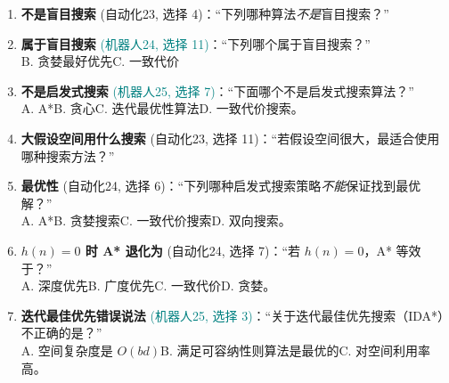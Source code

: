 ﻿\documentclass[../main.tex]{subfiles}
\begin{document}
\begin{enumerate}[itemsep=0.45em, topsep=0.2em, leftmargin=1.5em]
    \item \textbf{不是盲目搜索} \textcolor{autoclassgreen}{(自动化23, 选择 4)}：``下列哪种算法\emph{不是}盲目搜索？''\\
     

    \item \textbf{属于盲目搜索} \textcolor{teal}{(机器人24, 选择 11)}：``下列哪个属于盲目搜索？''\\
    \quad B. 贪婪最好优先\quad C. 一致代价\quad {}
    

    \item \textbf{不是启发式搜索} \textcolor{teal}{(机器人25, 选择 7)}：``下面哪个不是启发式搜索算法？''\\
    A. A*\quad B. 贪心\quad C. 迭代最优性算法\quad D. 一致代价搜索。 

    \item \textbf{大假设空间用什么搜索} \textcolor{autoclassgreen}{(自动化23, 选择 11)}：``若假设空间很大，最适合使用哪种搜索方法？''\\
     

    \item \textbf{最优性} \textcolor{autoclassgreen}{(自动化24, 选择 6)}：``下列哪种启发式搜索策略\emph{不能}保证找到最优解？''\\
    A. A*\quad B. 贪婪搜索\quad C. 一致代价搜索\quad D. 双向搜索。 

    \item \textbf{$h(n)=0$ 时 A* 退化为} \textcolor{autoclassgreen}{(自动化24, 选择 7)}：``若 $h(n)=0$，A* 等效于？''\\
    A. 深度优先\quad B. 广度优先\quad C. 一致代价\quad D. 贪婪。 

    \item \textbf{迭代最佳优先错误说法} \textcolor{teal}{(机器人25, 选择 3)}：``关于迭代最佳优先搜索（IDA*）不正确的是？''\\
    A. 空间复杂度是 $O(bd)$\quad B. 满足可容纳性则算法是最优的\quad C. 对空间利用率高\quad {}。 


\end{enumerate}
\end{document}
